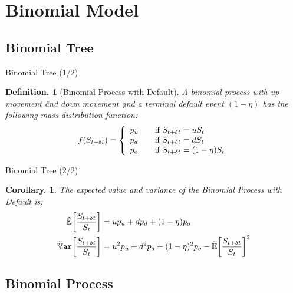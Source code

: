 \documentclass{beamer}
\newtheorem{cor}[thm]{Corollary.}
\newtheorem{defn}[thm]{Definition.}
\begin{document}

\section{Binomial Model} %


\subsection{Binomial Tree}

\begin{frame}{Binomial Tree (1/2)}
\begin{defn}[Binomial Process with Default]
A binomial process with up movement \u and down movement \d and a terminal default event $(1 - \eta)$ has the following mass distribution function:
\begin{equation}
 f(\SDt) = \left\{\begin{array}{l@{\qquad\mbox{if }}l} \pu & \SDt = u\S \\ \pd & \SDt = d\S \\ \po & \SDt = (1 - \eta)\S \end{array} \right.
\end{equation}
\end{defn}
\end{frame}

\begin{frame}{Binomial Tree (2/2)}
\begin{cor}
The expected value and variance of the Binomial Process with Default is:
\begin{align}
 \E[\frac{\SDt}{\S}]   &= \u\pu + \d\pd + (1 - \eta)\po \\
 \Var[\frac{\SDt}{\S}] &= \u^2\pu + \d^2\pd + (1 - \eta)^2\po - \E[\frac{\SDt}{\S}]^2
\end{align}
\end{cor}
\end{frame}


\subsection{Binomial Process}
\end{document}

